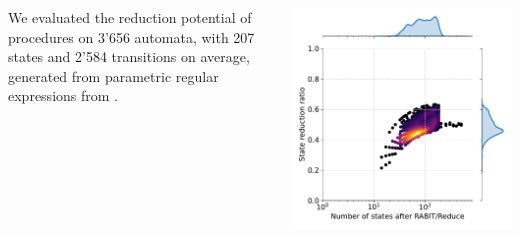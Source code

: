 \documentclass[25pt, a1paper, portrait]{tikzposter}
\begin{document}
\begin{columns}
    {
        We evaluated the reduction potential of procedures on 3'656 automata, with 207 states and 2'584 transitions on average, generated from parametric regular expressions from \cite{Regex}.

        \begin{tikzfigure}
            \centering
            \begin{minipage}{0.21\textwidth}
                \centering
                \includegraphics[width=1\linewidth]{images/intersect-all-states.pdf}
            \end{minipage}
            \begin{minipage}{0.21\textwidth}
                \centering

\end{minipage}
\end{tikzfigure}}
\end{columns}
\end{document}
